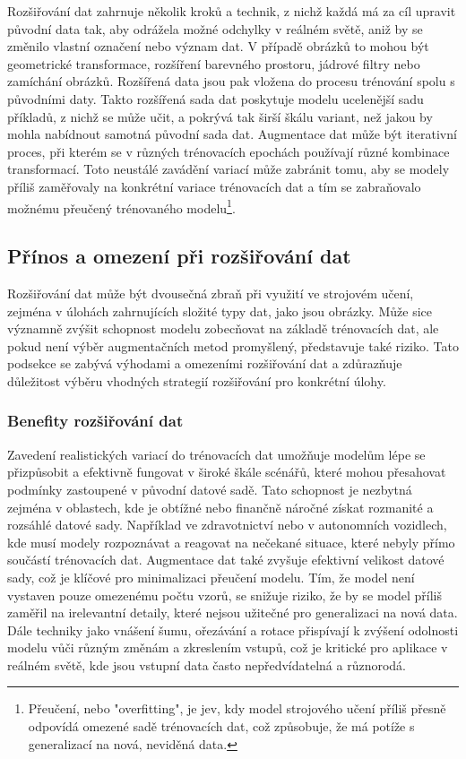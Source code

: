 \documentclass[male,czech,api_ing]{thesis}
\begin{document}
Rozšiřování dat zahrnuje několik kroků a technik, z nichž každá má za cíl upravit původní data tak, aby odrážela možné odchylky v reálném světě, aniž by se změnilo vlastní označení nebo význam dat. V případě obrázků to mohou být geometrické transformace, rozšíření barevného prostoru, jádrové filtry nebo zamíchání obrázků. Rozšířená data jsou pak vložena do procesu trénování spolu s původními daty. Takto rozšířená sada dat poskytuje modelu ucelenější sadu příkladů, z nichž se může učit, a pokrývá tak širší škálu variant, než jakou by mohla nabídnout samotná původní sada dat. Augmentace dat může být iterativní proces, při kterém se v různých trénovacích epochách používají různé kombinace transformací. Toto neustálé zavádění variací může zabránit tomu, aby se modely příliš zaměřovaly na konkrétní variace trénovacích dat a tím se zabraňovalo možnému přeučený trénovaného modelu\footnote{Přeučení, nebo "overfitting", je jev, kdy model strojového učení příliš přesně odpovídá omezené sadě trénovacích dat, což způsobuje, že má potíže s generalizací na nová, neviděná data.}. \cite{AugmentationBasics, AugmentationSurvey}

\subsection{Přínos a omezení při rozšiřování dat}
Rozšiřování dat může být dvousečná zbraň při využití ve strojovém učení, zejména v úlohách zahrnujících složité typy dat, jako jsou obrázky. Může sice významně zvýšit schopnost modelu zobecňovat na základě trénovacích dat, ale pokud není výběr augmentačních metod promyšlený, představuje také riziko. Tato podsekce se zabývá výhodami a omezeními rozšiřování dat a zdůrazňuje důležitost výběru vhodných strategií rozšiřování pro konkrétní úlohy.

\subsubsection{Benefity rozšiřování dat}
Zavedení realistických variací do trénovacích dat umožňuje modelům lépe se přizpůsobit a efektivně fungovat v široké škále scénářů, které mohou přesahovat podmínky zastoupené v původní datové sadě. Tato schopnost je nezbytná zejména v oblastech, kde je obtížné nebo finančně náročné získat rozmanité a rozsáhlé datové sady. Například ve zdravotnictví nebo v autonomních vozidlech, kde musí modely rozpoznávat a reagovat na nečekané situace, které nebyly přímo součástí trénovacích dat. Augmentace dat také zvyšuje efektivní velikost datové sady, což je klíčové pro minimalizaci přeučení modelu. Tím, že model není vystaven pouze omezenému počtu vzorů, se snižuje riziko, že by se model příliš zaměřil na irelevantní detaily, které nejsou užitečné pro generalizaci na nová data. Dále techniky jako vnášení šumu, ořezávání a rotace přispívají k zvýšení odolnosti modelu vůči různým změnám a zkreslením vstupů, což je kritické pro aplikace v reálném světě, kde jsou vstupní data často nepředvídatelná a různorodá. \cite{AugmentationBasics, AugmentationSurvey}
\end{document}
